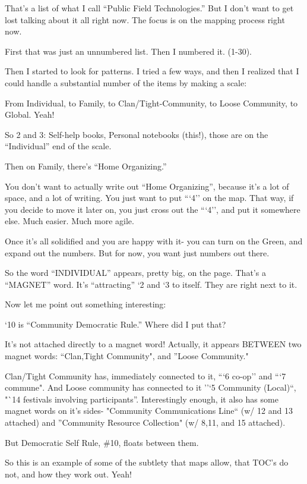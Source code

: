 \documentclass[oneside]{book}
\begin{document}
That's a list of what I call ``Public Field Technologies.'' But I don't
want to get lost talking about it all right now. The focus is on the
mapping process right now.

First that was just an unnumbered list. Then I numbered it. (1-30).

Then I started to look for patterns. I tried a few ways, and then I
realized that I could handle a substantial number of the items by
making a scale:

From Individual, to Family, to Clan/Tight-Community, to Loose
Community, to Global. Yeah!

So 2 and 3: Self-help books, Personal notebooks (this!), those are on the
``Individual'' end of the scale.

Then on Family, there's ``Home Organizing.''

You don't want to actually write out ``Home Organizing'', because it's a
lot of space, and a lot of writing. You just want to put ```4'' on the
map. That way, if you decide to move it later on, you just cross out
the ```4'', and put it somewhere else. Much easier. Much more agile.

Once it's all solidified and you are happy with it- you can turn on
the Green, and expand out the numbers. But for now, you want just
numbers out there.

So the word ``INDIVIDUAL'' appears, pretty big, on the page. That's a
``MAGNET'' word. It's ``attracting'' `2 and `3 to itself. They are right
next to it.

Now let me point out something interesting:

`10 is ``Community Democratic Rule.'' Where did I put that?

It's not attached directly to a magnet word! Actually, it appears
BETWEEN two magnet words: ``Clan,Tight Community", and ''Loose
Community."

Clan/Tight Community has, immediately connected to it, ```6 co-op'' and
```7 commune". And Loose community has connected to it ''`5 Community
(Local)``, "`14 festivals involving participants''. Interestingly
enough, it also has some magnet words on it's sides- "Community
Communications Line`` (w/ 12 and 13 attached) and ''Community Resource
Collection" (w/ 8,11, and 15 attached).

But Democratic Self Rule, \#10, floats between them.

So this is an example of some of the subtlety that maps allow, that
TOC's do not, and how they work out. Yeah!
\end{document}
